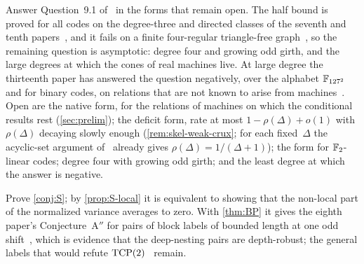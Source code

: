 \begin{problem}\label{prob:crux}
Answer Question~9.1 of~\cite{DirectedRecovery2026} in the forms that remain open. The half bound is proved for all codes
on the degree-three and directed classes of the seventh and tenth papers~\cite{SeventhPaper2026,DirectedReciprocity2026},
and it fails on a finite four-regular triangle-free graph~\cite{SeventhPaper2026}, so the remaining question is
asymptotic: degree four and growing odd girth, and the large degrees at which the cones of real machines live. At large
degree the thirteenth paper has answered the question negatively, over the alphabet $\mathbb{F}_{127^2}$ and for binary codes, on
relations that are not known to arise from machines~\cite[Theorem~A and Corollary~A$'$]{StorageCodes2026}. Open are the
native form, for the relations of machines on which the conditional results rest (\cref{sec:prelim}); the deficit form,
rate at most $1-\rho(\Delta)+o(1)$ with $\rho(\Delta)$ decaying slowly enough (\cref{rem:skel-weak-crux}; for each
fixed~$\Delta$ the acyclic-set argument of~\cite[Proposition~4.14]{FourthPaper2026} already gives
$\rho(\Delta)=1/(\Delta+1)$); the form for $\mathbb{F}_2$-linear codes; degree four with growing odd girth; and the least degree at which the answer is negative.
\end{problem}

\begin{problem}\label{prob:S}
Prove \cref{conj:S}; by \cref{prop:S-local} it is equivalent to showing that the non-local part of the normalized variance
averages to zero. With \cref{thm:BP} it gives the eighth paper's Conjecture~A$''$ for pairs of block labels of bounded
length at one odd shift~\cite[Conjecture~5.24]{BoundedNesting2026}, which is evidence that the deep-nesting pairs are
depth-robust; the general labels that would refute $\mathrm{TCP}(2)$~\cite[Corollary~5.26]{BoundedNesting2026} remain.
\end{problem}
